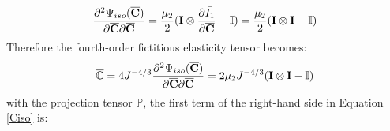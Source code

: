 \begin{equation}
\frac{\partial^2\Psi_{iso}(\overline{\bold{C}})}{\partial\overline{\bold{C}}\partial\overline{\bold{C}}} = 
\frac{\mu_2}{2}(\bold{I} \otimes \frac{\partial{\bar{I_1}}}{\partial{\overline{\bold{C}}}} - \mathbb{I}) = \frac{\mu_2}{2}(\bold{I} \otimes \bold{I} - \mathbb{I})
\end{equation}
Therefore the fourth-order fictitious elasticity tensor becomes:
\begin{equation}
\overline{\mathbb{C}} = 4J^{-4/3}\frac{\partial^2\Psi_{iso}(\overline{\bold{C}})}{\partial{\overline{\bold{C}}}{\partial{\overline{\bold{C}}}}} = 2\mu_2{J^{-4/3}}(\bold{I} \otimes \bold{I} - \mathbb{I})
\end{equation}
with the projection tensor $\mathbb{P}$, the first term of the right-hand side in Equation \ref{Ciso} is:

